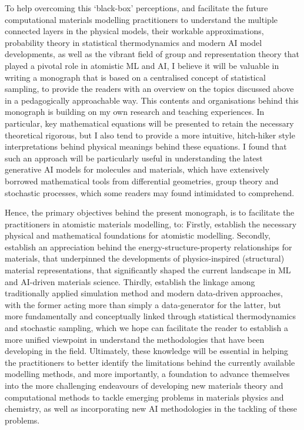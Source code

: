 To help overcoming this `black-box' perceptions, and facilitate the future computational materials modelling practitioners to understand the multiple connected layers in the physical models, their workable approximations, probability theory in statistical thermodynamics and modern AI model developments, as well as the vibrant field of group and representation theory that played a pivotal role in atomistic ML and AI, I believe it will be valuable in writing a monograph that is based on a centralised concept of statistical sampling, to provide the readers with an overview on the topics discussed above in a pedagogically approachable way. This contents and organisations behind this monograph is building on my own research and teaching experiences. In particular, key mathematical equations will be presented to retain the necessary theoretical rigorous, but I also tend to provide a more intuitive, hitch-hiker style interpretations behind physical meanings behind these equations. I found that such an approach will be particularly useful in understanding the latest generative AI models for molecules and materials, which have extensively borrowed  mathematical tools from differential geometries, group theory and stochastic processes, which some readers may found intimidated to comprehend.

Hence, the primary objectives behind the present monograph, is to facilitate the practitioners in atomistic materials modelling, to: Firstly, establish the necessary physical and mathematical foundations for atomistic modelling. Secondly, establish an appreciation behind the energy-structure-property relationships for materials, that underpinned the developments of physics-inspired (structural) material representations, that significantly shaped the current landscape in ML and AI-driven materials science.  Thirdly, establish the linkage among traditionally applied simulation method and modern data-driven approaches, with the former acting more than simply a data-generator for the latter, but more fundamentally and conceptually linked through statistical thermodynamics and stochastic sampling, which we hope can facilitate the reader to establish a more unified viewpoint in understand the methodologies that have been developing in the field. Ultimately, these knowledge will be essential in helping the practitioners to better identify the limitations behind the currently available modelling methods, and more importantly, a foundation to advance themselves into the more challenging endeavours of developing  new materials theory and computational methods to tackle emerging problems in materials physics and chemistry, as well as incorporating new AI methodologies in the tackling of these problems. 

